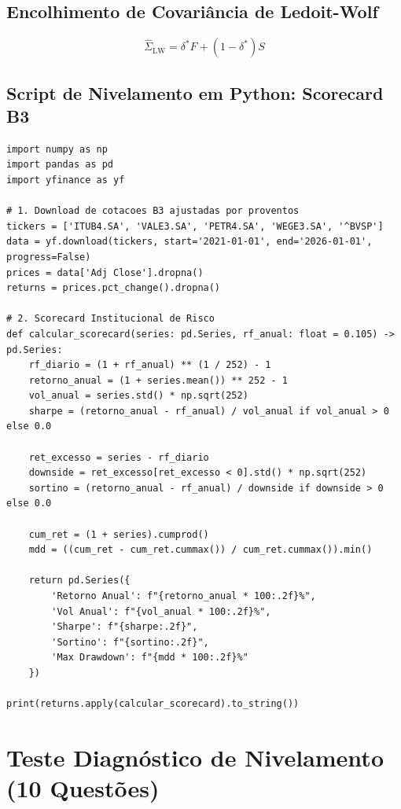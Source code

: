 \documentclass[11pt,a4paper]{article}
\begin{document}
\subsection{Encolhimento de Covariância de Ledoit-Wolf}
\begin{equation}
\hat{\Sigma}_{\text{LW}} = \delta^* F + (1 - \delta^*) S
\end{equation}

\subsection{Script de Nivelamento em Python: Scorecard B3}
\begin{lstlisting}
import numpy as np
import pandas as pd
import yfinance as yf

# 1. Download de cotacoes B3 ajustadas por proventos
tickers = ['ITUB4.SA', 'VALE3.SA', 'PETR4.SA', 'WEGE3.SA', '^BVSP']
data = yf.download(tickers, start='2021-01-01', end='2026-01-01', progress=False)
prices = data['Adj Close'].dropna()
returns = prices.pct_change().dropna()

# 2. Scorecard Institucional de Risco
def calcular_scorecard(series: pd.Series, rf_anual: float = 0.105) -> pd.Series:
    rf_diario = (1 + rf_anual) ** (1 / 252) - 1
    retorno_anual = (1 + series.mean()) ** 252 - 1
    vol_anual = series.std() * np.sqrt(252)
    sharpe = (retorno_anual - rf_anual) / vol_anual if vol_anual > 0 else 0.0
    
    ret_excesso = series - rf_diario
    downside = ret_excesso[ret_excesso < 0].std() * np.sqrt(252)
    sortino = (retorno_anual - rf_anual) / downside if downside > 0 else 0.0
    
    cum_ret = (1 + series).cumprod()
    mdd = ((cum_ret - cum_ret.cummax()) / cum_ret.cummax()).min()
    
    return pd.Series({
        'Retorno Anual': f"{retorno_anual * 100:.2f}%",
        'Vol Anual': f"{vol_anual * 100:.2f}%",
        'Sharpe': f"{sharpe:.2f}",
        'Sortino': f"{sortino:.2f}",
        'Max Drawdown': f"{mdd * 100:.2f}%"
    })

print(returns.apply(calcular_scorecard).to_string())
\end{lstlisting}

\vspace{10pt}

\section{Teste Diagnóstico de Nivelamento (10 Questões)}
\end{document}

